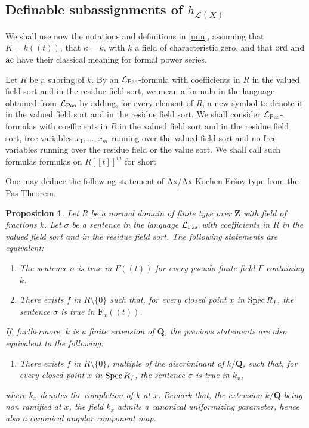\documentclass[english,12pt]{amsart}
\def\ac{{\rm ac}}
\def\FF{{\mathbf F}}
\def\QQ{{\mathbf Q}}
\def\ZZ{{\mathbf Z}}
\def\cL{{\mathcal L}}
\newtheorem{prop}[subsubsection]{Proposition}
\theoremstyle{definition}
\theoremstyle{remark}
\theoremstyle{plain}
\numberwithin{equation}{subsection}
\def\FF{{\mathbf F}}
\def\QQ{{\mathbf Q}}
\def\ZZ{{\mathbf Z}}
\def\cL{{\mathcal L}}
\def\ord{{\rm ord}}
\begin{document}
\subsection{Definable subassignments of $h_{\cL (X)}$}We shall use now
the notations and definitions in \ref{uuu}, assuming
that $K = k ((t))$, that
$\kappa = k$, with $k$
a field of characteristic zero,
and that $\ord$ and $\ac$ have their classical meaning for 
formal power series.


\medskip 
Let $R$ be a subring of $k$.
By an $\cL_{\rm Pas}$-formula
with coefficients in $R$ in the valued field sort and in the residue
field sort, we mean a formula in the language obtained from
$\cL_{\rm Pas}$ by adding, for every element of $R$,
a new symbol to denote it in the valued field sort and in the residue
field sort. 
We shall consider $\cL_{\rm Pas}$-formulas
with coefficients in $R$ in the valued field sort and in the residue
field sort, free
variables $x_{1}, \ldots, x_{m}$ running
over the valued field sort and no free
variables running over
the residue field or the value sort. We shall call such formulas
formulas on $R [[t]]^m$ for short







\medskip
One may deduce the
following statement  of Ax/Ax-Kochen-Er{\v s}ov type 
from
the Pas Theorem.



\begin{prop}\label{axax}Let $R$ be a
normal domain 
of finite type over $\ZZ$ with field of fractions $k$.
Let $\sigma$ be a sentence
in the language $\cL_{{\rm Pas}}$ with coefficients in $R$
in the valued field sort and in the residue
field sort. The following
statements are equivalent:
\begin{enumerate}
\item[(1)] The sentence
$\sigma$ is true in $F ((t))$ for every pseudo-finite field $F$
containing
$k$.    
\item[(2)]
There exists $f$ in $R \setminus \{0\}$
such that, for every closed point $x$ in ${\rm Spec} \, R_{f}$,
the sentence $\sigma$ is true in $\FF_{x}((t))$.
\end{enumerate}
If, furthermore, $k$ is a finite extension of $\QQ$, the previous statements
are also equivalent to the following:
\begin{enumerate}
\item[(3)]There exists $f$ in $R \setminus \{0\}$, multiple of the
discriminant of $k / \QQ$,
such that, for every closed point $x$ in ${\rm Spec} \, R_{f}$,
the sentence $\sigma$ is true in $k_{x}$,
\end{enumerate}
where $k_{x}$ denotes the completion of $k$ at $x$. Remark that, 
the extension $k / \QQ$ being non ramified at $x$,
the field $k_{x}$ admits a canonical uniformizing parameter, hence
also
a canonical
angular component map.
\end{prop}
\end{document}
